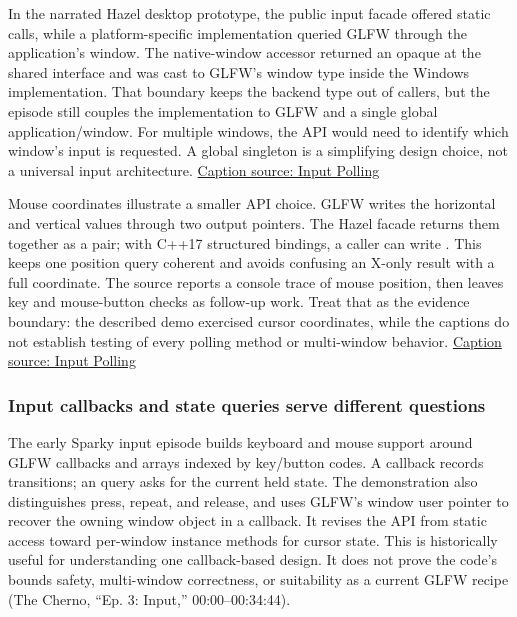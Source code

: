 In the narrated Hazel desktop prototype, the public input facade offered static calls, while a platform-specific implementation queried GLFW through the application's window. The native-window accessor returned an opaque  at the shared interface and was cast to GLFW's window type inside the Windows implementation. That boundary keeps the backend type out of callers, but the episode still couples the implementation to GLFW and a single global application/window. For multiple windows, the API would need to identify which window's input is requested. A global singleton is a simplifying design choice, not a universal input architecture. \href{https://www.youtube.com/watch?v=yuhNj8yGDJQ}{Caption source: Input Polling}

Mouse coordinates illustrate a smaller API choice. GLFW writes the horizontal and vertical values through two output pointers. The Hazel facade returns them together as a pair; with C++17 structured bindings, a caller can write . This keeps one position query coherent and avoids confusing an X-only result with a full coordinate. The source reports a console trace of mouse position, then leaves key and mouse-button checks as follow-up work. Treat that as the evidence boundary: the described demo exercised cursor coordinates, while the captions do not establish testing of every polling method or multi-window behavior. \href{https://www.youtube.com/watch?v=yuhNj8yGDJQ}{Caption source: Input Polling}

\subsubsection{Input callbacks and state queries serve different questions}\label{05-engine-i-ch013-input-callbacks-and-state-queries-serve-different-questions}

\hypertarget{05-engine-i-ch013-input-callbacks-and-state-queries-serve-different-questions}{}

The early Sparky input episode builds keyboard and mouse support around GLFW callbacks and arrays indexed by key/button codes. A callback records transitions; an  query asks for the current held state. The demonstration also distinguishes press, repeat, and release, and uses GLFW's window user pointer to recover the owning window object in a callback. It revises the API from static access toward per-window instance methods for cursor state. This is historically useful for understanding one callback-based design. It does not prove the code's bounds safety, multi-window correctness, or suitability as a current GLFW recipe (The Cherno, ``Ep. 3: Input,'' 00:00--00:34:44).

